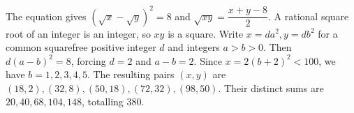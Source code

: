 The equation gives $(\sqrt{x}-\sqrt{y})^2=8$ and $\sqrt{xy}=\dfrac{x+y-8}{2}$. A rational square root of an integer is an integer, so $xy$ is a square. Write $x=da^2,y=db^2$ for a common squarefree positive integer $d$ and integers $a>b>0$. Then $d(a-b)^2=8$, forcing $d=2$ and $a-b=2$. Since $x=2(b+2)^2<100$, we have $b=1,2,3,4,5$. The resulting pairs $(x,y)$ are $(18,2),(32,8),(50,18),(72,32),(98,50)$. Their distinct sums are $20,40,68,104,148$, totalling $\boxed{380}$.
